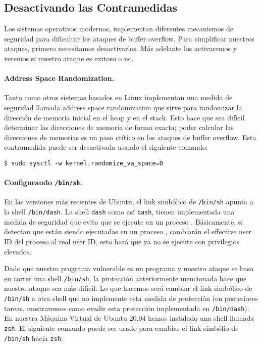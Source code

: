 \subsection{Desactivando las Contramedidas}

Los sistemas operativos modernos, implementan diferentes mecanismos de seguridad para dificultar los ataques de buffer overflow.
Para simplificar nuestros ataques, primero necesitamos desactivarlos.
Más adelante los activaremos y veremos si nuestro ataque es exitoso o no.


\paragraph{Address Space Randomization.}
Tanto \ubuntu como otros sistemas basados en Linux implementan una medida de seguridad llamada address space randomization que sirve para randomizar la dirección de memoria inicial en el heap y en el stack. Esto hace que sea difícil determinar las direcciones de memoria de forma exacta; poder calcular las direcciones de memorias es un paso crítico en los ataques de buffer overflow.
Esta contramedida puede ser desactivada usando el siguiente comando:

\begin{lstlisting}
$ sudo sysctl -w kernel.randomize_va_space=0
\end{lstlisting}


\paragraph{Configurando \texttt{/bin/sh}.} En las versiones más recientes de Ubuntu, el link simbólico de \texttt{/bin/sh} apunta a la shell \texttt{/bin/dash}. La shell \texttt{dash} como así \texttt{bash}, tienen implementada una medida de seguridad que evita que se ejecute en un proceso \setuid. Básicamente, si detectan que están siendo ejecutadas en un proceso \setuid, cambiarán el effective user ID del proceso al real user ID, esto hará que ya no se ejecute con privilegios elevados.


Dado que nuestro programa vulnerable es un programa \setuid y nuestro ataque se basa en correr una shell \texttt{/bin/sh}, la protección anteriormente mencionada hace que nuestro ataque sea más difícil. Lo que haremos será cambiar el link simbólico de \texttt{/bin/sh} a otra shell que no implemente esta medida de protección (en posteriores tareas, mostraremos como evadir esta protección implementada en \texttt{/bin/dash}). En nuestra Máquina Virtual de Ubuntu 20.04 hemos instalado una shell llamada \texttt{zsh}. El siguiente comando puede ser usado para cambiar el link simbólio de \texttt{/bin/sh} hacia \texttt{zsh}:


